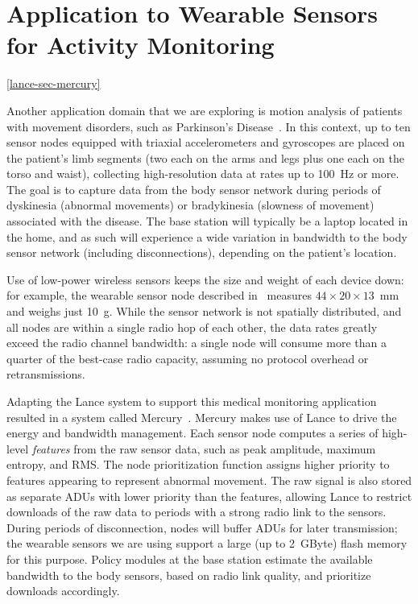 \section{Application to Wearable Sensors for Activity Monitoring}
\ref{lance-sec-mercury}

Another application domain that we are exploring is motion analysis of
patients with movement disorders, such as Parkinson's
Disease~\cite{parkinsons-embs07}. In this context, up to ten sensor nodes
equipped with triaxial accelerometers and gyroscopes are placed on the
patient's limb segments (two each on the arms and legs plus one each on the
torso and waist), collecting high-resolution data at rates up to 100~Hz or
more. The goal is to capture data from the body sensor network during periods
of dyskinesia (abnormal movements) or bradykinesia (slowness of movement)
associated with the disease. The base station will typically be a laptop
located in the home, and as such will experience a wide variation in
bandwidth to the body sensor network (including disconnections), depending on
the patient's location.

Use of low-power wireless sensors keeps the size and weight of each device
down: for example, the wearable sensor node described
in~\cite{parkinsons-embs07} measures $44 \times 20 \times 13$~mm and weighs
just 10~g. While the sensor network is not spatially distributed, and all
nodes are within a single radio hop of each other, the data rates greatly
exceed the radio channel bandwidth: a single node will consume more than a
quarter of the best-case radio capacity, assuming no protocol overhead or
retransmissions.

Adapting the Lance system to support this medical monitoring application
resulted in a system called Mercury~\cite{mercury-sensys09}. Mercury makes
use of Lance to drive the energy and bandwidth management. Each sensor node
computes a series of high-level \textit{features} from the raw sensor data,
such as peak amplitude, maximum entropy, and RMS. The node prioritization
function assigns higher priority to features appearing to represent abnormal
movement. The raw signal is also stored as separate ADUs with lower priority
than the features, allowing Lance to restrict downloads of the raw data to
periods with a strong radio link to the sensors. During periods of
disconnection, nodes will buffer ADUs for later transmission; the wearable
sensors we are using support a large (up to 2~GByte) flash memory for this
purpose. Policy modules at the base station estimate the available bandwidth
to the body sensors, based on radio link quality, and prioritize downloads
accordingly.

